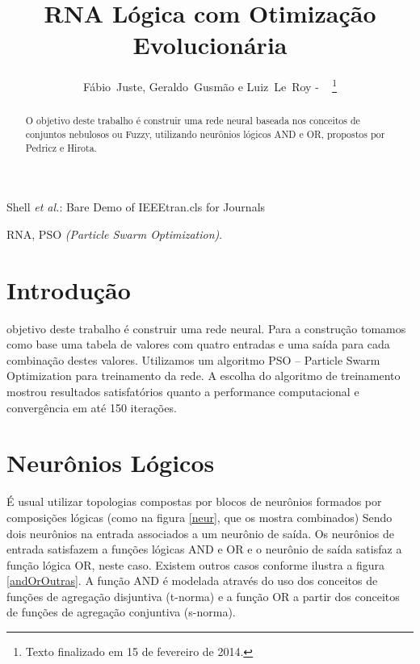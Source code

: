 \documentclass{IEEEtran}
\begin{document}
%
\title{RNA Lógica com Otimização Evolucionária}
%
%
%

\author{Fábio~Juste, Geraldo~Gusmão e Luiz~Le~Roy - ~
\thanks{Texto finalizado em 15 de fevereiro de 2014.}}

%
{Shell \MakeLowercase{\textit{et al.}}: Bare Demo of IEEEtran.cls for Journals}

\maketitle

\begin{abstract}
O objetivo deste trabalho é construir uma rede neural baseada nos conceitos de conjuntos nebulosos ou Fuzzy,  utilizando neurônios lógicos AND e OR, propostos por Pedricz e Hirota.
\end{abstract}

\begin{IEEEkeywords}
RNA, PSO \textit{(Particle Swarm Optimization)}.
\end{IEEEkeywords}

\IEEEpeerreviewmaketitle

\section{Introdução}
 objetivo deste trabalho é construir uma rede neural.
Para a construção tomamos como base uma  tabela de valores com quatro entradas e uma saída para cada combinação destes valores. Utilizamos um algoritmo PSO – Particle Swarm Optimization para treinamento da rede.  A escolha do algoritmo de treinamento mostrou resultados satisfatórios quanto a performance computacional  e convergência em até 150 iterações.

\section{Neurônios Lógicos}
É usual utilizar topologias compostas por blocos de neurônios formados por composições lógicas (como na figura \ref{neur}, que os mostra combinados) Sendo dois neurônios na entrada associados a um neurônio de saída. Os neurônios de entrada satisfazem a funções lógicas AND e OR e o neurônio de saída satisfaz a função lógica OR, neste caso. Existem outros casos conforme ilustra a figura \ref{andOrOutras}. A função AND é modelada  através do uso dos conceitos de funções de agregação disjuntiva (t-norma) e a função OR  a partir dos conceitos de funções de agregação conjuntiva (s-norma).
\end{document}
